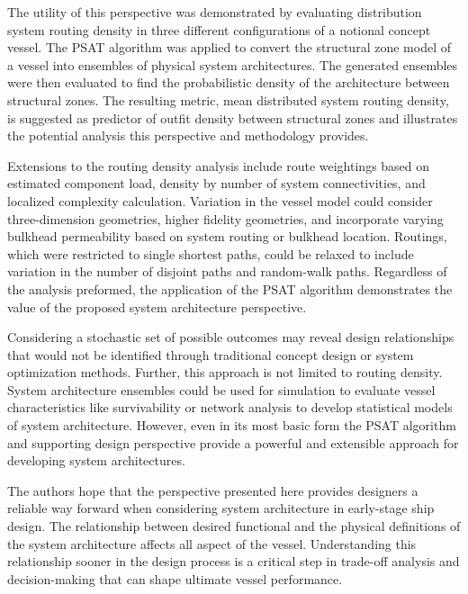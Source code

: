 \documentclass[preprint,12pt]{elsarticle}
\begin{document}
The utility of this perspective was demonstrated by evaluating distribution system routing density in three different configurations of a notional concept vessel. The PSAT algorithm was applied to convert the structural zone model of a vessel into ensembles of physical system architectures. The generated ensembles were then evaluated to find the probabilistic density of the architecture between structural zones. The resulting metric, mean distributed system routing density, is suggested as predictor of outfit density between structural zones and illustrates the potential analysis this perspective and methodology provides.  

Extensions to the routing density analysis include route weightings based on estimated component load, density by number of system connectivities, and localized complexity calculation. Variation in the vessel model could consider three-dimension geometries, higher fidelity geometries, and incorporate varying bulkhead permeability based on system routing or bulkhead location. Routings, which were restricted to single shortest paths, could be relaxed to include variation in the number of disjoint paths and random-walk paths. Regardless of the analysis preformed, the application of the PSAT algorithm demonstrates the value of the proposed system architecture perspective. 

Considering a stochastic set of possible outcomes may reveal design relationships that would not be identified through traditional concept design or system optimization methods. Further, this approach is not limited to routing density. System architecture ensembles could be used for simulation to evaluate vessel characteristics like survivability or network analysis to develop statistical models of system architecture. However, even in its most basic form the PSAT algorithm and supporting design perspective provide a powerful and extensible approach for developing system architectures.

The authors hope that the perspective presented here provides designers a reliable way forward when considering system architecture in early-stage ship design. The relationship between desired functional and the physical definitions of the system architecture affects all aspect of the vessel. Understanding this relationship sooner in the design process is a critical step in trade-off analysis and decision-making that can shape ultimate vessel performance. 


\end{document}
